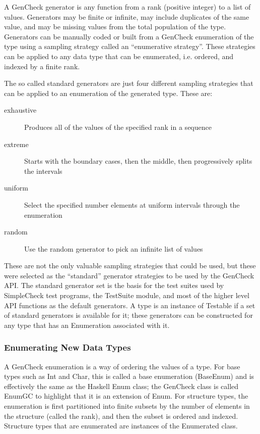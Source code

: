 A GenCheck generator is any function from a rank (positive integer) to a list of values.
Generators may be finite or infinite, may include duplicates of the same value,
and may be missing values from the total population of the type.  Generators
can be manually coded or built from a GenCheck enumeration of the type using
a sampling strategy called an ``enumerative strategy''.  These strategies can be
applied to any data type that can be enumerated, i.e. ordered, and indexed by a finite rank.

The so called standard generators are just four different sampling strategies
that can be applied to an enumeration of the generated type.  These are:

\begin{description}
\item[exhaustive] {Produces all of the values of the specified rank in a sequence}
\item[extreme]{Starts with the boundary cases, then the middle, then progressively splits the intervals}
\item[uniform]{Select the specified number elements at uniform intervals through the enumeration}
\item[random]{Use the random generator to pick an infinite list of values}
\end{description}

These are not the only valuable sampling strategies that could be used, but these were
selected as the ``standard'' generator strategies to be used by the GenCheck API.
The standard generator set is the basis for the test suites used by SimpleCheck test programs,
the TestSuite module, and most of the higher level API functions as the default generators.
A type is an instance of Testable if a set of standard generators is available for it;
these generators can be constructed for any type that has an Enumeration associated with it. 

\subsubsection{Enumerating New Data Types}
A GenCheck enumeration is a way of ordering the values of a type.
For base types such as Int and Char, this is called a base enumeration (BaseEnum)
and is effectively the same as the Haskell Enum class;
the GenCheck class is called EnumGC to highlight that it is an extension of Enum.
For structure types, the enumeration is first partitioned into finite subsets
by the number of elements in the structure (called the rank),
and then the subset is ordered and indexed.
Structure types that are enumerated are instances of the Enumerated class.

